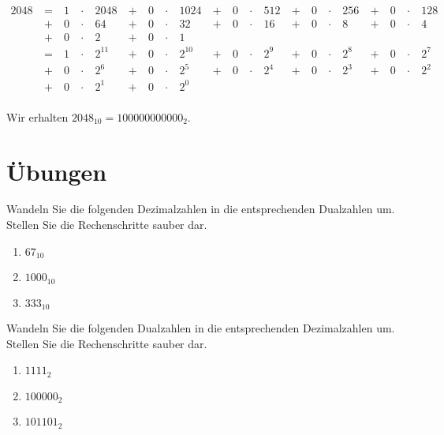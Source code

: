 \begin{example}

\begin{align*}
2048 & ~ = ~ & 1 & ~\cdot~ & 2048  & ~ + ~ & 0 & ~\cdot~ & 1024 & ~ + ~ & 0 & ~\cdot~ & 512 & ~ + ~ & 0 & ~\cdot~ & 256 & ~ + ~ & 0 & ~\cdot~ & 128 \\ 
& ~ + ~ & 0 & ~\cdot~ & 64 & ~ + ~ & 0 & ~\cdot~ & 32 & ~ + ~ & 0 & ~\cdot~ & 16 & ~ + ~ & 0 & ~\cdot~ & 8 & ~ + ~ & 0 & ~\cdot~ & 4 \\
& ~ + ~ & 0 & ~\cdot~ & 2 & ~ + ~ & 0 & ~\cdot~ & 1  \\
& ~ = ~ & 1 & ~\cdot~ & 2^{11}  & ~ + ~ & 0 & ~\cdot~ & 2^{10}  & ~ + ~ & 0 & ~\cdot~ & 2^9 & ~ + ~ & 0 & ~\cdot~ & 2^8 & ~ + ~ & 0 & ~\cdot~ & 2^7 \\ 
& ~ + ~ & 0 & ~\cdot~ & 2^6 & ~ + ~ & 0 & ~\cdot~ & 2^5 & ~ + ~ & 0 & ~\cdot~ & 2^4 & ~ + ~ & 0 & ~\cdot~ & 2^3 & ~ + ~ & 0 & ~\cdot~ & 2^2 \\ 
& ~ + ~ & 0 & ~\cdot~ & 2^1 & ~ + ~ & 0 & ~\cdot~ & 2^0  \\
\end{align*}

Wir erhalten $2048_{10} = 100000000000_2$.

\end{example}

\newpage

\section{Übungen}

\begin{exercise}
Wandeln Sie die folgenden Dezimalzahlen in die entsprechenden Dualzahlen um. Stellen Sie die Rechenschritte sauber dar.

\begin{enumerate}
\item $67_{10}$
\fillwithgrid{2.5in}
\item $1000_{10}$
\fillwithgrid{2.5in}
\item $333_{10}$
\fillwithgrid{2.5in}
\end{enumerate}
\end{exercise}

\begin{exercise}
Wandeln Sie die folgenden Dualzahlen in die entsprechenden Dezimalzahlen um. Stellen Sie die Rechenschritte sauber dar.

\begin{enumerate}
\item $1111_2$
\fillwithgrid{1.25in}
\item $100000_2$
\fillwithgrid{1.25in}
\item $101101_2$
\fillwithgrid{1.25in}
\end{enumerate}
\end{exercise}


